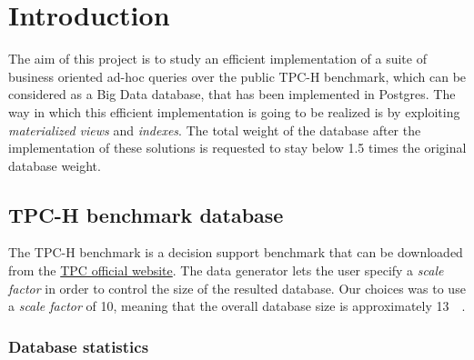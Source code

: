 

\section{Introduction}
\label{section:introduction}

The aim of this project is to study an efficient implementation of a suite of business oriented ad-hoc queries over the public TPC-H benchmark, which can be considered as a Big Data database, that has been implemented in Postgres. The way in which this efficient implementation is going to be realized is by exploiting \textit{materialized views} and \textit{indexes}. The total weight of the database after the implementation of these solutions is requested to stay below \num{1.5} times the original database weight.

\subsection{TPC-H benchmark database}

The TPC-H benchmark is a decision support benchmark that can be downloaded from the \href{https://www.tpc.org/tpch/}{TPC official website}. The data generator lets the user specify a \textit{scale factor} in order to control the size of the resulted database. Our choices was to use a \textit{scale factor} of \num{10}, meaning that the overall database size is approximately \SI{13}{\giga\byte}.

\subsubsection{Database statistics}

